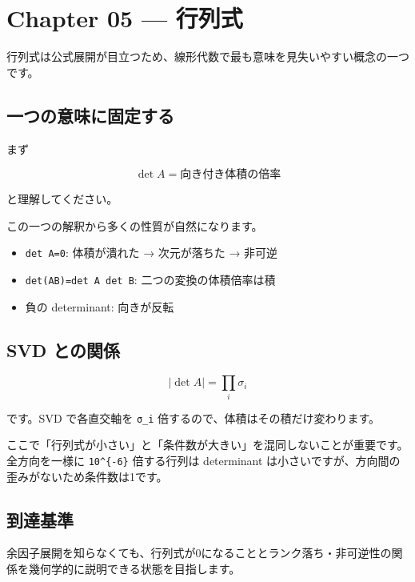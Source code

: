\documentclass[
  11pt,
  a4paper,
]{ltjsarticle}
\author{}
\date{}
\providecommand{\tightlist}{%
  \setlength{\itemsep}{0pt}\setlength{\parskip}{0pt}}
\begin{document}
\hypertarget{chapter-05-ux884cux5217ux5f0f}{%
\section{Chapter 05 --- 行列式}\label{chapter-05-ux884cux5217ux5f0f}}

行列式は公式展開が目立つため、線形代数で最も意味を見失いやすい概念の一つです。

\hypertarget{ux4e00ux3064ux306eux610fux5473ux306bux56faux5b9aux3059ux308b}{%
\subsection{一つの意味に固定する}\label{ux4e00ux3064ux306eux610fux5473ux306bux56faux5b9aux3059ux308b}}

まず

\[
\det A=\text{向き付き体積の倍率}
\]

と理解してください。

この一つの解釈から多くの性質が自然になります。

\begin{itemize}
\tightlist
\item
  \texttt{det\ A=0}: 体積が潰れた → 次元が落ちた → 非可逆
\item
  \texttt{det(AB)=det\ A\ det\ B}: 二つの変換の体積倍率は積
\item
  負の determinant: 向きが反転
\end{itemize}

\hypertarget{svd-ux3068ux306eux95a2ux4fc2}{%
\subsection{SVD との関係}\label{svd-ux3068ux306eux95a2ux4fc2}}

\[
|\det A|=\prod_i\sigma_i
\]

です。SVD で各直交軸を \texttt{σ\_i}
倍するので、体積はその積だけ変わります。

ここで「行列式が小さい」と「条件数が大きい」を混同しないことが重要です。全方向を一様に
\texttt{10\^{}\{-6\}} 倍する行列は determinant
は小さいですが、方向間の歪みがないため条件数は1です。

\hypertarget{ux5230ux9054ux57faux6e96}{%
\subsection{到達基準}\label{ux5230ux9054ux57faux6e96}}

余因子展開を知らなくても、行列式が0になることとランク落ち・非可逆性の関係を幾何学的に説明できる状態を目指します。
\end{document}
